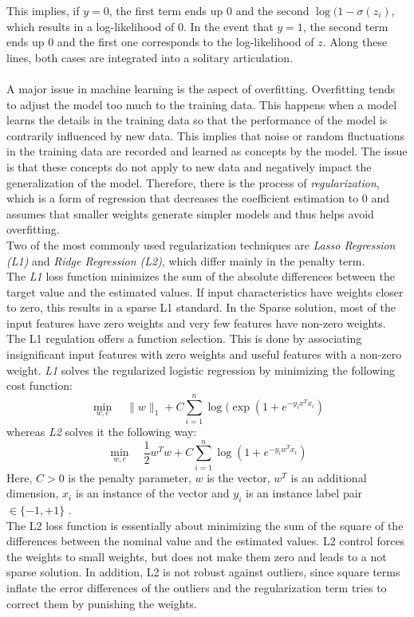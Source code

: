 \documentclass[a4paper, 11pt,titlepage,oneside,openany]{book}
\begin{document}
\noindent This implies, if $y=0$, the first term ends up $0$ and the second $\log(1-\sigma(z_i)$, which results in a log-likelihood of $0$. In the event that $y=1$, the second term ends up 0 and the first one corresponds to the log-likelihood of $z$. Along these lines, both cases are integrated into a solitary articulation. \\
\\ A major issue in machine learning is the aspect of overfitting. Overfitting tends to adjust the model too much to the training data. This happens when a model learns the details in the training data so that the performance of the model is contrarily influenced by new data. This implies that noise or random fluctuations in the training data are recorded and learned as concepts by the model. The issue is that these concepts do not apply to new data and negatively impact the generalization of the model. Therefore, there is the process of \textit{regularization}, which is a form of regression that decreases the coefficient estimation to $0$ and assumes that smaller weights generate simpler models and thus helps avoid overfitting. \\
\noindent Two of the most commonly used regularization techniques are \textit{Lasso Regression (L1)} and \textit{Ridge Regression (L2)}, which differ mainly in the penalty term. \\
\noindent The \textit{L1} loss function minimizes the sum of the absolute differences between the target value and the estimated values. If input characteristics have weights closer to zero, this results in a sparse L1 standard. In the Sparse solution, most of the input features have zero weights and very few features have non-zero weights. The L1 regulation offers a function selection. This is done by associating insignificant input features with zero weights and useful features with a non-zero weight. 
\noindent \textit{L1} solves the regularized logistic regression by minimizing the following cost function:
\[
\min_{w, c} \quad \|w\|_1 + C \sum_{i=1}^n \log(\exp(1+e^{-y_ix^Tx_i})
\]
whereas \textit{L2} solves it the following way:
\[
\min_{w, c} \quad \frac{1}{2}w^T w + C \sum_{i=1}^n \log(1+e^{-y_iw^Tx_i})
\]
Here, $C>0$ is the penalty parameter, $w$ is the vector, $w^T$ is an additional dimension, $x_i$ is an instance of the vector and $y_i$ is an instance label pair $\in \{-1,+1\}$ \cite{liblinear}.\\
The L2 loss function is essentially about minimizing the sum of the square of the differences between the nominal value and the estimated values.
L2 control forces the weights to small weights, but does not make them zero and leads to a not sparse solution. In addition, L2 is not robust against outliers, since square terms inflate the error differences of the outliers and the regularization term tries to correct them by punishing the weights.
\end{document}
